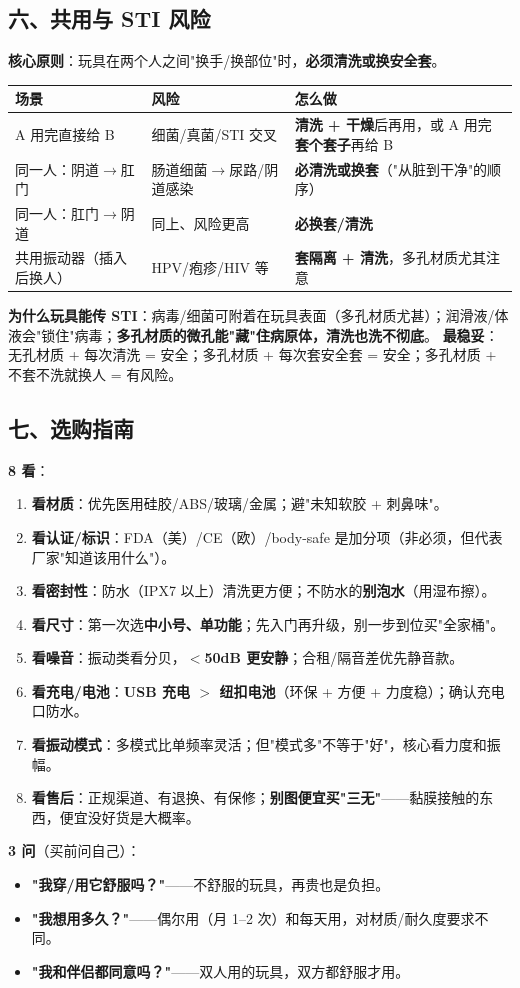 \documentclass[12pt,UTF8,openany]{ctexbook}
\begin{document}
\subsection*{六、共用与 STI 风险}
\textbf{核心原则}：玩具在两个人之间"换手/换部位"时，\textbf{必须清洗或换安全套}。
\begin{tabularx}{\textwidth}{X X X}
\toprule
\textbf{场景} & \textbf{风险} & \textbf{怎么做} \\
\midrule
A 用完直接给 B & 细菌/真菌/STI 交叉 & \textbf{清洗 + 干燥}后再用，或 A 用完\textbf{套个套子}再给 B \\
同一人：阴道$\to$肛门 & 肠道细菌$\to$尿路/阴道感染 & \textbf{必清洗或换套}（"从脏到干净"的顺序） \\
同一人：肛门$\to$阴道 & 同上、风险更高 & \textbf{必换套/清洗} \\
共用振动器（插入后换人） & HPV/疱疹/HIV 等 & \textbf{套隔离 + 清洗}，多孔材质尤其注意 \\
\bottomrule
\end{tabularx}
\par\smallskip
\textbf{为什么玩具能传 STI}：病毒/细菌可附着在玩具表面（多孔材质尤甚）；润滑液/体液会"锁住"病毒；\textbf{多孔材质的微孔能"藏"住病原体，清洗也洗不彻底}。
\textbf{最稳妥}：无孔材质 + 每次清洗 = 安全；多孔材质 + 每次套安全套 = 安全；多孔材质 + 不套不洗就换人 = 有风险。

\subsection*{七、选购指南}
\textbf{8 看}：
\begin{enumerate}[leftmargin=2em,itemsep=0.2em]
  \item \textbf{看材质}：优先医用硅胶/ABS/玻璃/金属；避"未知软胶 + 刺鼻味"。
  \item \textbf{看认证/标识}：FDA（美）/CE（欧）/body-safe 是加分项（非必须，但代表厂家"知道该用什么"）。
  \item \textbf{看密封性}：防水（IPX7 以上）清洗更方便；不防水的\textbf{别泡水}（用湿布擦）。
  \item \textbf{看尺寸}：第一次选\textbf{中小号、单功能}；先入门再升级，别一步到位买"全家桶"。
  \item \textbf{看噪音}：振动类看分贝，\textbf{$<$50dB 更安静}；合租/隔音差优先静音款。
  \item \textbf{看充电/电池}：\textbf{USB 充电 $>$ 纽扣电池}（环保 + 方便 + 力度稳）；确认充电口防水。
  \item \textbf{看振动模式}：多模式比单频率灵活；但"模式多"不等于"好"，核心看力度和振幅。
  \item \textbf{看售后}：正规渠道、有退换、有保修；\textbf{别图便宜买"三无"}——黏膜接触的东西，便宜没好货是大概率。
\end{enumerate}
\textbf{3 问}（买前问自己）：
\begin{itemize}[leftmargin=2em,itemsep=0.2em]
  \item \textbf{"我穿/用它舒服吗？"}——不舒服的玩具，再贵也是负担。
  \item \textbf{"我想用多久？"}——偶尔用（月 1--2 次）和每天用，对材质/耐久度要求不同。
  \item \textbf{"我和伴侣都同意吗？"}——双人用的玩具，双方都舒服才用。
\end{itemize}
\end{document}
